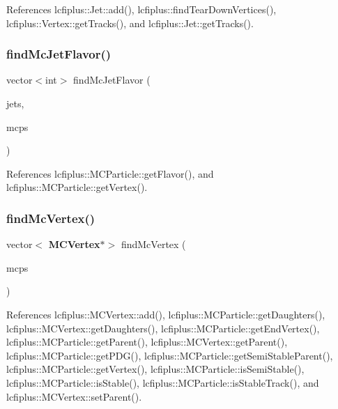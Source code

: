 References lcfiplus\+::\+Jet\+::add(), lcfiplus\+::find\+Tear\+Down\+Vertices(), lcfiplus\+::\+Vertex\+::get\+Tracks(), and lcfiplus\+::\+Jet\+::get\+Tracks().

\mbox{\label{Driver_8cc_a4f5f9c7c430f7a7f3cfbb6fc2ce990fe}} 
\subsubsection{find\+Mc\+Jet\+Flavor()}
{\footnotesize\ttfamily vector$<$int$>$ find\+Mc\+Jet\+Flavor (\begin{DoxyParamCaption}\item[{vector$<$ const \textbf{ Jet} $\ast$$>$}]{jets,  }\item[{vector$<$ const \textbf{ M\+C\+Particle} $\ast$$>$}]{mcps }\end{DoxyParamCaption})}



References lcfiplus\+::\+M\+C\+Particle\+::get\+Flavor(), and lcfiplus\+::\+M\+C\+Particle\+::get\+Vertex().

\mbox{\label{Driver_8cc_a87ccccca3d1bb92748df9882948de3c7}} 
\subsubsection{find\+Mc\+Vertex()}
{\footnotesize\ttfamily vector$<$\textbf{ M\+C\+Vertex}$\ast$$>$ find\+Mc\+Vertex (\begin{DoxyParamCaption}\item[{vector$<$ const \textbf{ M\+C\+Particle} $\ast$$>$}]{mcps }\end{DoxyParamCaption})}



References lcfiplus\+::\+M\+C\+Vertex\+::add(), lcfiplus\+::\+M\+C\+Particle\+::get\+Daughters(), lcfiplus\+::\+M\+C\+Vertex\+::get\+Daughters(), lcfiplus\+::\+M\+C\+Particle\+::get\+End\+Vertex(), lcfiplus\+::\+M\+C\+Particle\+::get\+Parent(), lcfiplus\+::\+M\+C\+Vertex\+::get\+Parent(), lcfiplus\+::\+M\+C\+Particle\+::get\+P\+D\+G(), lcfiplus\+::\+M\+C\+Particle\+::get\+Semi\+Stable\+Parent(), lcfiplus\+::\+M\+C\+Particle\+::get\+Vertex(), lcfiplus\+::\+M\+C\+Particle\+::is\+Semi\+Stable(), lcfiplus\+::\+M\+C\+Particle\+::is\+Stable(), lcfiplus\+::\+M\+C\+Particle\+::is\+Stable\+Track(), and lcfiplus\+::\+M\+C\+Vertex\+::set\+Parent().

